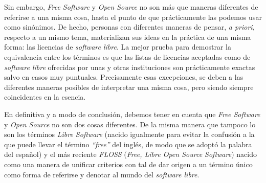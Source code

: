 Sin embargo, \textit{Free Software} y \textit{Open Source} no son más que
maneras diferentes de referirse a una misma cosa, hasta el punto de que
prácticamente las podemos usar como sinónimos. De hecho, personas con diferentes
maneras de pensar, \textit{a priori}, respecto a un mismo tema, materializan sus
ideas en la práctica de una misma forma: las licencias de \textit{software
libre}. La mejor prueba para demostrar la equivalencia entre los términos es
que las listas de licencias aceptadas como de \textit{software libre} ofrecidas
por unas y otras instituciones son prácticamente exactas salvo en casos muy
puntuales. Precisamente esas excepciones, se deben a las diferentes maneras
posibles de interpretar una misma cosa, pero siendo siempre coincidentes en la
esencia.

En definitiva y a modo de conclusión, debemos tener en cuenta que \textit{Free
Software} y \textit{Open Source} no son dos cosas diferentes. De la misma manera
que tampoco lo son los términos \textit{Libre Software} (nacido igualmente para
evitar la confusión a la que puede llevar el término \textit{``free''} del
inglés, de modo que se adoptó la palabra del español) y el más reciente
\textit{FLOSS} (\textit{Free, Libre Open Source Software}) nacido como una
manera de unificar criterios con tal de dar origen a un término único como
forma de referirse y denotar al mundo del \textit{software libre}.
